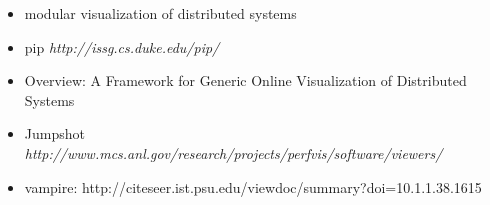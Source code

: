 \begin{itemize}

\item modular visualization of distributed systems

\item pip \textit{http://issg.cs.duke.edu/pip/}

\item Overview: A Framework for Generic Online Visualization of Distributed
Systems

\item Jumpshot \textit{http://www.mcs.anl.gov/research/projects/perfvis/software/viewers/}

\item vampire: http://citeseer.ist.psu.edu/viewdoc/summary?doi=10.1.1.38.1615

\end{itemize}
